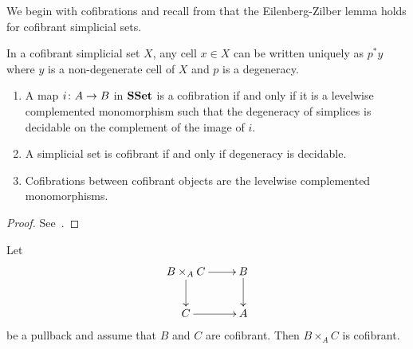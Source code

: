 \documentclass[reqno,10pt,a4paper,oneside,draft]{amsart}
\begin{document}
We begin with cofibrations and recall from \cite[\S5.1.5]{henry2018wms} that the Eilenberg-Zilber lemma holds for cofibrant simplicial sets.

\begin{lemma}
\label{lem:EZ_cof}In a cofibrant simplicial set $X$, any cell $x \in X$ can be written uniquely as $p^* y$ where $y$ is a non-degenerate cell of $X$ and $p$ is a degeneracy.
\end{lemma}


\begin{proposition} \hfill 
\begin{enumerate}[$(i)$]
\item A map $i \colon A \to B$ in $\mathbf{SSet}$ is a cofibration if and only if it is a levelwise complemented monomorphism such that the degeneracy of simplices is decidable on the complement of the image of $i$. 
\item A simplicial set is cofibrant if and only if degeneracy is decidable.
\item Cofibrations between cofibrant
objects are the levelwise complemented monomorphisms.
\end{enumerate}
\end{proposition}

\begin{proof} See~\cite[Proposition 5.1.7]{henry2018wms}.
\end{proof}




 






\begin{lemma}\label{lem:cofibrant_fiber_product}
Let 
\[
\xymatrix{
B \times_A C \ar[r] \ar[d] & B \ar[d] \\
C \ar[r] & A }
\]
be a pullback and assume that $B$ and $C$ are cofibrant. Then $B \times_{A} C$ is cofibrant.
\end{lemma}
\end{document}
